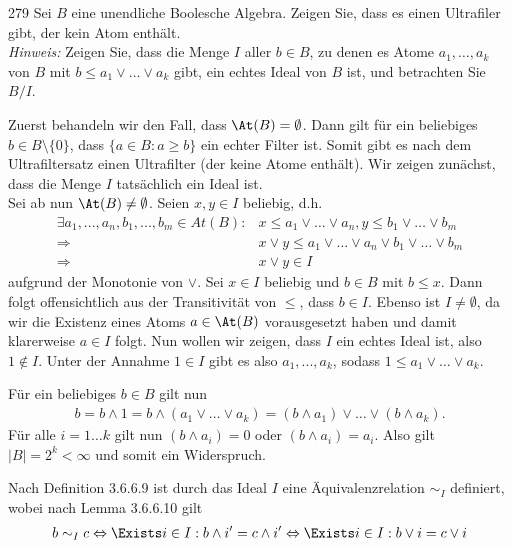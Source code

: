 \begin{algebraUE}{279}
Sei $B$ eine unendliche Boolesche Algebra. Zeigen Sie, dass es einen Ultrafiler gibt,
der kein Atom enthält. \\
\textit{Hinweis:} Zeigen Sie, dass die Menge $I$ aller $b \in B$, zu denen es
Atome $a_1,\dots,a_k$ von $B$ mit $b \leq a_1 \lor \dots \lor a_k$ gibt,
ein echtes Ideal von $B$ ist, und betrachten Sie $B/I$.
\end{algebraUE}
\begin{solution}
Zuerst behandeln wir den Fall, dass $\At(B) = \emptyset$. Dann gilt für ein beliebiges $b \in B\setminus \{ 0\}$, dass $\{ a \in B: a \geq b\}$ ein echter Filter ist. Somit gibt es nach dem Ultrafiltersatz einen Ultrafilter (der keine Atome enthält).
Wir zeigen zunächst, dass die Menge $I$ tatsächlich ein Ideal ist. \\

Sei ab nun $\At(B) \neq \emptyset$.
Seien $x, y \in I$ beliebig, d.h.
\begin{align*}
  \exists a_1,...,a_n,b_1,...,b_m \in At(B): &x \leq a_1 \lor \dots \lor a_n , y \leq b_1 \lor \dots \lor b_m \\
  \Rightarrow &x \lor y \leq a_1 \lor \dots \lor a_n \lor b_1 \lor \dots \lor b_m \\
  \Rightarrow &x\lor y \in I
\end{align*}
aufgrund der Monotonie von $\lor$.
Sei $x \in I$ beliebig und $b \in B$ mit $b \leq x$. Dann folgt offensichtlich aus der Transitivität von $\leq$, dass $b \in I$.
Ebenso ist $I \neq \emptyset$, da wir die Existenz eines Atoms $a \in \At(B)$
vorausgesetzt haben und damit klarerweise $a \in I$ folgt.
Nun wollen wir zeigen, dass $I$ ein echtes Ideal ist, also $1 \notin I$.
Unter der Annahme $1 \in I$ gibt es also $a_1,...,a_k$, sodass $1 \leq a_1 \lor \dots \lor a_k$.

Für ein beliebiges $b \in B$ gilt nun
\begin{align*}
  b = b \land 1 = b \land (a_1 \lor \dots \lor a_k) = (b \land a_1) \lor \dots \lor (b \land a_k).
\end{align*}
Für alle $i=1 \dots k$ gilt nun $(b \land a_i) = 0$ oder $ (b \land a_i) = a_i$. Also gilt $|B| = 2^k < \infty$ und somit ein Widerspruch.

Nach Definition 3.6.6.9 ist durch das Ideal $I$ eine Äquivalenzrelation $\sim_I$ definiert, wobei nach Lemma 3.6.6.10 gilt
\begin{align*}
  b \sim_I c \Leftrightarrow \Exists i \in I: b \land i' = c \land i' \Leftrightarrow \Exists i \in I: b \lor i = c \lor i
\end{align*}


\end{solution}

